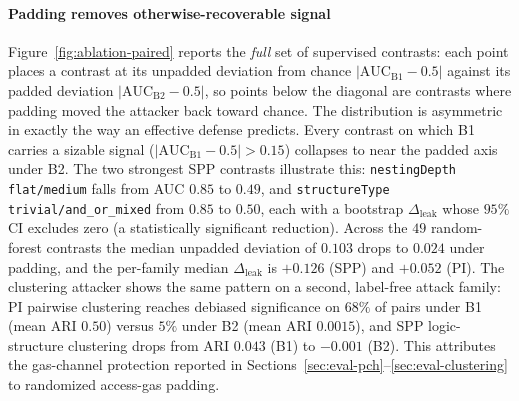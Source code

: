\paragraph{Padding removes otherwise-recoverable signal}
Figure~\ref{fig:ablation-paired} reports the \emph{full} set of supervised contrasts: each point places a contrast at its unpadded deviation from chance $|\mathrm{AUC}_{\mathrm{B1}}-0.5|$ against its padded deviation
$|\mathrm{AUC}_{\mathrm{B2}}-0.5|$, so points below the diagonal are contrasts where
padding moved the attacker back toward chance.
The distribution is asymmetric in exactly the way an effective defense predicts.
Every contrast on which B1 carries a sizable signal ($|\mathrm{AUC}_{\mathrm{B1}}-0.5|>0.15$) collapses to near the padded axis under B2. The two strongest SPP contrasts illustrate this: \texttt{nestingDepth flat/medium} falls from AUC $0.85$ to $0.49$, and \texttt{structureType trivial/and\_or\_mixed} from $0.85$ to $0.50$, each with a bootstrap $\Delta_{\text{leak}}$ whose $95\%$ CI excludes zero (a statistically significant reduction).
Across the $49$ random-forest contrasts the median unpadded deviation of $0.103$ drops to $0.024$ under padding, and the per-family median $\Delta_{\text{leak}}$ is $+0.126$ (SPP) and $+0.052$ (PI).
The clustering attacker shows the same pattern on a second, label-free attack family: PI pairwise clustering reaches debiased significance on $68\%$ of pairs under B1 (mean ARI $0.50$) versus $5\%$ under B2 (mean ARI $0.0015$), and SPP logic-structure clustering drops from ARI $0.043$ (B1) to $-0.001$ (B2).
This attributes the gas-channel protection reported in Sections~\ref{sec:eval-pch}--\ref{sec:eval-clustering}
to randomized access-gas padding.

